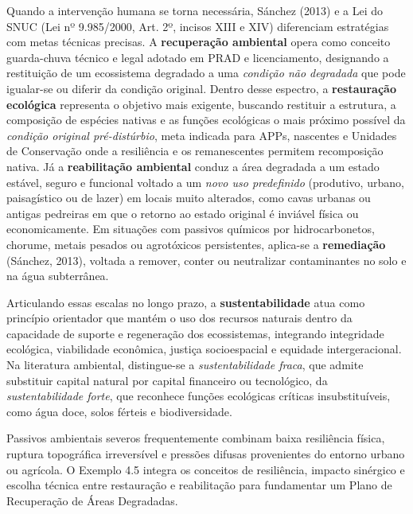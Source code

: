 Quando a intervenção humana se torna necessária, Sánchez (2013) e a Lei do SNUC (Lei nº 9.985/2000, Art. 2º, incisos XIII e XIV) diferenciam estratégias com metas técnicas precisas. A \textbf{recuperação ambiental} opera como conceito guarda-chuva técnico e legal adotado em PRAD e licenciamento, designando a restituição de um ecossistema degradado a uma \textit{condição não degradada} que pode igualar-se ou diferir da condição original. Dentro desse espectro, a \textbf{restauração ecológica} representa o objetivo mais exigente, buscando restituir a estrutura, a composição de espécies nativas e as funções ecológicas o mais próximo possível da \textit{condição original pré-distúrbio}, meta indicada para APPs, nascentes e Unidades de Conservação onde a resiliência e os remanescentes permitem recomposição nativa. Já a \textbf{reabilitação ambiental} conduz a área degradada a um estado estável, seguro e funcional voltado a um \textit{novo uso predefinido} (produtivo, urbano, paisagístico ou de lazer) em locais muito alterados, como cavas urbanas ou antigas pedreiras em que o retorno ao estado original é inviável física ou economicamente. Em situações com passivos químicos por hidrocarbonetos, chorume, metais pesados ou agrotóxicos persistentes, aplica-se a \textbf{remediação} (Sánchez, 2013), voltada a remover, conter ou neutralizar contaminantes no solo e na água subterrânea.

Articulando essas escalas no longo prazo, a \textbf{sustentabilidade} atua como princípio orientador que mantém o uso dos recursos naturais dentro da capacidade de suporte e regeneração dos ecossistemas, integrando integridade ecológica, viabilidade econômica, justiça socioespacial e equidade intergeracional. Na literatura ambiental, distingue-se a \textit{sustentabilidade fraca}, que admite substituir capital natural por capital financeiro ou tecnológico, da \textit{sustentabilidade forte}, que reconhece funções ecológicas críticas insubstituíveis, como água doce, solos férteis e biodiversidade.


Passivos ambientais severos frequentemente combinam baixa resiliência física, ruptura topográfica irreversível e pressões difusas provenientes do entorno urbano ou agrícola. O Exemplo 4.5 integra os conceitos de resiliência, impacto sinérgico e escolha técnica entre restauração e reabilitação para fundamentar um Plano de Recuperação de Áreas Degradadas.


